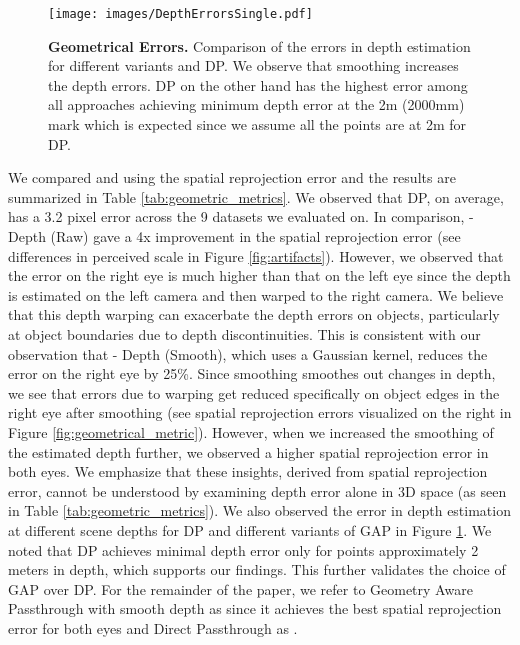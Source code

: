 \begin{figure}[!h]
    \centering
    \texttt{[image: images/DepthErrorsSingle.pdf]}
    \caption{\textbf{Geometrical Errors.} Comparison of the errors in depth estimation for different \GAP variants and DP. We observe that smoothing increases the depth errors. DP on the other hand has the highest error among all approaches achieving minimum depth error at the 2m (2000mm) mark which is expected since we assume all the points are at 2m for DP.}
    \label{fig:depth_errors}
\end{figure}

We compared \DP and \GAP using the spatial reprojection error and the results are summarized in Table \ref{tab:geometric_metrics}. We observed that DP, on average, has a 3.2 pixel error across the 9 datasets we evaluated on. In comparison, \GAP - Depth (Raw) gave a 4x improvement in the spatial reprojection error (see differences in perceived scale in Figure \ref{fig:artifacts}). However, we observed that the error on the right eye is much higher than that on the left eye since the depth is estimated on the left camera and then warped to the right camera. We believe that this depth warping can exacerbate the depth errors on objects, particularly at object boundaries due to depth discontinuities. This is consistent with our observation that \GAP - Depth (Smooth), which uses a Gaussian kernel, reduces the error on the right eye by 25\%. Since smoothing smoothes out changes in depth, we see that errors due to warping get reduced specifically on object edges in the right eye after smoothing (see spatial reprojection errors visualized on the right in Figure \ref{fig:geometrical_metric}). However, when we increased the smoothing of the estimated depth further, we observed a higher spatial reprojection error in both eyes. We emphasize that these insights, derived from spatial reprojection error, cannot be  understood by examining depth error alone in 3D space (as seen in Table \ref{tab:geometric_metrics}). We also observed the error in depth estimation at different scene depths for DP and different variants of GAP in Figure \ref{fig:depth_errors}. We noted that DP achieves  minimal depth error only for points approximately 2 meters in depth, which supports our findings. This further validates the choice of GAP over DP. For the remainder of the paper, we refer to Geometry Aware Passthrough with smooth depth as \GAP since it achieves the best spatial reprojection error for both eyes and Direct Passthrough as \DP.

